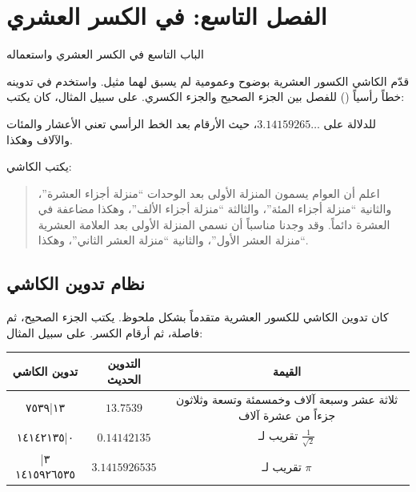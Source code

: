 \documentclass[11pt,a4paper]{book}
\newcommand{\ar}[1]{\arabicfont\beginR #1\endR}
\newcommand{\arLarge}[1]{{\Large\arabicfont\beginR #1\endR}}
\newenvironment{arabicbox}{%
  \begin{framed}
  \begin{minipage}{\linewidth-2\fboxsep-2\fboxrule}
  \setlength{\parindent}{0pt}
  \linespread{1.3}\selectfont
}{%
  \end{minipage}
  \end{framed}
}
\begin{document}
\section{\ar{الفصل التاسع: في الكسر العشري}}

\begin{arabicbox}
\begin{center}
\arLarge{الباب التاسع في الكسر العشري واستعماله}
\end{center}
\end{arabicbox}

\vspace{0.3cm}

\noindent\ar{قدّم الكاشي الكسور العشرية بوضوح وعمومية لم يسبق لهما مثيل. واستخدم في تدوينه خطاً رأسياً (\textbar) للفصل بين الجزء الصحيح والجزء الكسري. على سبيل المثال، كان يكتب:}

\begin{center}
\end{center}

\noindent\ar{للدلالة على $3.14159265\ldots$، حيث الأرقام بعد الخط الرأسي تعني الأعشار والمئات والآلاف وهكذا.}

\vspace{0.3cm}

\noindent\ar{يكتب الكاشي:}

\begin{quote}
\ar{اعلم أن العوام يسمون المنزلة الأولى بعد الوحدات ``منزلة أجزاء العشرة''، والثانية ``منزلة أجزاء المئة''، والثالثة ``منزلة أجزاء الألف''، وهكذا مضاعفة في العشرة دائماً. وقد وجدنا مناسباً أن نسمي المنزلة الأولى بعد العلامة العشرية ``منزلة العشر الأول''، والثانية ``منزلة العشر الثاني''، وهكذا.}
\end{quote}

\subsection{\ar{نظام تدوين الكاشي}}

\noindent\ar{كان تدوين الكاشي للكسور العشرية متقدماً بشكل ملحوظ. يكتب الجزء الصحيح، ثم فاصلة، ثم أرقام الكسر. على سبيل المثال:}

\begin{center}
\begin{tabular}{|c|c|c|}
\hline
\textbf{\ar{تدوين الكاشي}} & \textbf{\ar{التدوين الحديث}} & \textbf{\ar{القيمة}} \\
\hline
\ar{١٣|٧٥٣٩} & $13.7539$ & \ar{ثلاثة عشر وسبعة آلاف وخمسمئة وتسعة وثلاثون جزءاً من عشرة آلاف} \\
\hline
\ar{٠|١٤١٤٢١٣٥} & $0.14142135$ & \ar{تقريب لـ $\frac{1}{\sqrt{2}}$} \\
\hline
\ar{٣|١٤١٥٩٢٦٥٣٥} & $3.1415926535$ & \ar{تقريب لـ $\pi$} \\
\hline
\end{tabular}
\end{center}
\end{document}
